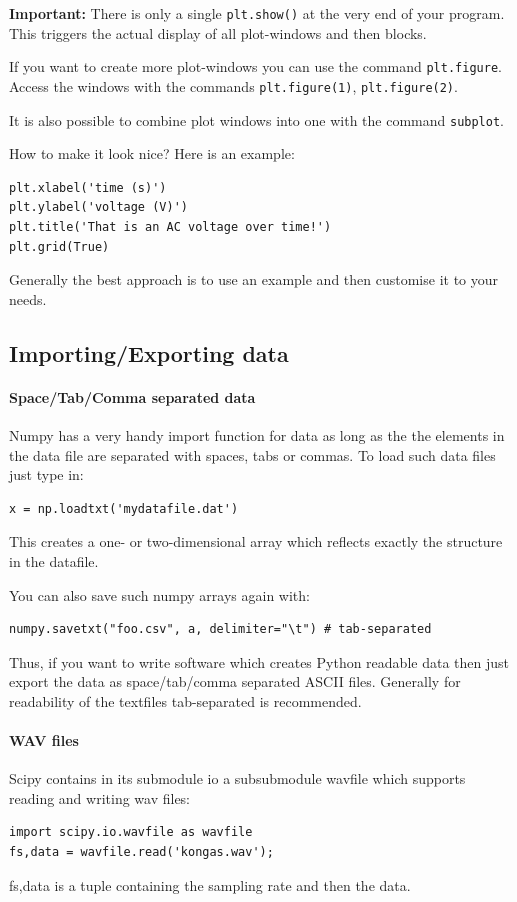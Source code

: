 \documentclass[12pt,a4paper]{article}
\begin{document}
\textbf{Important:} There is only a single \texttt{plt.show()} at the very end of your program.
This triggers the actual display of all plot-windows and then blocks.

If you want to create more plot-windows you can use the command
\texttt{plt.figure}. Access the windows with the commands \texttt{plt.figure(1)},
\texttt{plt.figure(2)}.

It is also possible to combine plot windows into one with the
command \texttt{subplot}.

How to make it look nice? Here is an example:
\begin{verbatim}
plt.xlabel('time (s)')
plt.ylabel('voltage (V)')
plt.title('That is an AC voltage over time!')
plt.grid(True)
\end{verbatim}

Generally the best approach is to use an example and then customise it to your needs.




\subsection{Importing/Exporting data}

\paragraph{Space/Tab/Comma separated data}
Numpy has a very handy import function for data as long as the the
elements in the data file are separated with spaces, tabs or
commas. To load such data files just type in:
\begin{verbatim}
x = np.loadtxt('mydatafile.dat')
\end{verbatim}
This creates a one- or two-dimensional array which reflects exactly the structure in the datafile.

You can also save such numpy arrays again with:

\begin{verbatim}
numpy.savetxt("foo.csv", a, delimiter="\t") # tab-separated
\end{verbatim}

Thus, if you want to write software which creates Python
readable data then just export the data as space/tab/comma separated ASCII files.
Generally for readability of the textfiles tab-separated is recommended.



\paragraph{WAV files}
Scipy contains in its submodule io a subsubmodule wavfile which supports
reading and writing wav files:
\begin{verbatim}
import scipy.io.wavfile as wavfile
fs,data = wavfile.read('kongas.wav');
\end{verbatim}
fs,data is a tuple containing the sampling rate and then the data.
\end{document}
